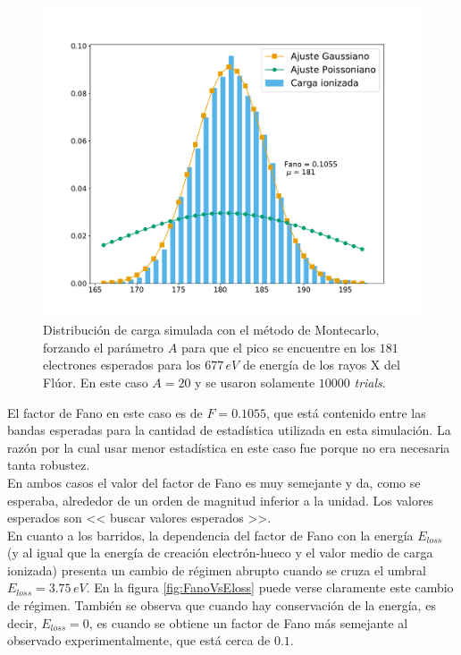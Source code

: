 \begin{figure}[h]
    \centering
    \includegraphics[scale=0.35]{Figs/Fano_677_Eloss0_10ktrials.pdf}
    \caption{\footnotesize{Distribución de carga simulada con el método de Montecarlo, forzando el parámetro $A$ para que el pico se encuentre en los $181$ electrones esperados para los $677\,\si{eV}$ de energía de los rayos X del Flúor. En este caso $A=20$ y se usaron solamente $10000$ \textit{trials}.}}
    \label{fig:Simulacion1rden1Fano2}
\end{figure}
El factor de Fano en este caso es de $F = 0.1055$, que está contenido entre las bandas esperadas para la cantidad de estadística utilizada en esta simulación. La razón por la cual usar menor estadística en este caso fue porque no era necesaria tanta robustez.\\
\indent En ambos casos el valor del factor de Fano es muy semejante y da, como se esperaba, alrededor de un orden de magnitud inferior a la unidad. Los valores esperados son << buscar valores esperados >>.\\
\indent En cuanto a los barridos, la dependencia del factor de Fano con la energía $E_{loss}$ (y al igual que la energía de creación electrón-hueco y el valor medio de carga ionizada) presenta un cambio de régimen abrupto cuando se cruza el umbral $E_{loss} = 3.75\,\si{eV}$. En la figura \ref{fig:FanoVsEloss} puede verse claramente este cambio de régimen. También se observa que cuando hay conservación de la energía, es decir, $E_{loss} = 0$, es cuando se obtiene un factor de Fano más semejante al observado experimentalmente, que está cerca de $0.1$.

